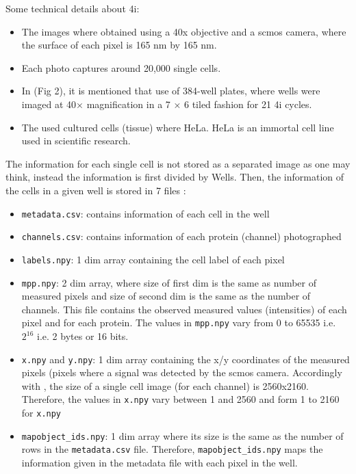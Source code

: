 
Some technical details about \gls{4i}:
\begin{itemize}
  \item The images where obtained using a 40x objective and a \gls{scmos} camera, where the surface of each pixel is 165 nm by 165 nm.
  \item Each photo captures around 20,000 single cells.
  \item In \cite{Guteaar7042} (Fig 2), it is mentioned that use of 384-well plates, where wells were imaged at 40× magnification in a 7 × 6 tiled fashion for 21 4i cycles.
  \item The used cultured cells (tissue) where HeLa. HeLa is an immortal cell line used in scientific research.
\end{itemize}

The information for each single cell is not stored as a separated image as one may think, instead the information is first divided by Wells. Then, the information of the cells in a given well is stored in 7 files :
\begin{itemize}
  \item \texttt{metadata.csv}: contains information of each cell in the well
  \item \texttt{channels.csv}: contains information of each protein (channel) photographed
  \item \texttt{labels.npy}: 1 dim array containing the cell label of each pixel
  \item \texttt{mpp.npy}: 2 dim array, where size of first dim is the same as number of measured pixels and size of second dim is the same as the number of channels. This file contains the observed measured values (intensities) of each pixel and for each protein. The values in \texttt{mpp.npy} vary from 0 to 65535 i.e. $2^{16}$ i.e. 2 bytes or 16 bits.
  \item \texttt{x.npy} and \texttt{y.npy}: 1 dim array containing the x/y coordinates of the measured pixels (pixels where a signal was detected by the \gls{scmos} camera. Accordingly with \cite{Guteaar7042}, the size of a single cell image (for each channel) is 2560x2160. Therefore, the values in \texttt{x.npy} vary between 1 and 2560 and form 1 to 2160 for \texttt{x.npy}
  \item \texttt{mapobject\_ids.npy}: 1 dim array where its size is the same as the number of rows in the \texttt{metadata.csv} file. Therefore, \texttt{mapobject\_ids.npy} maps the information given in the metadata file with each pixel in the well.
\end{itemize}

